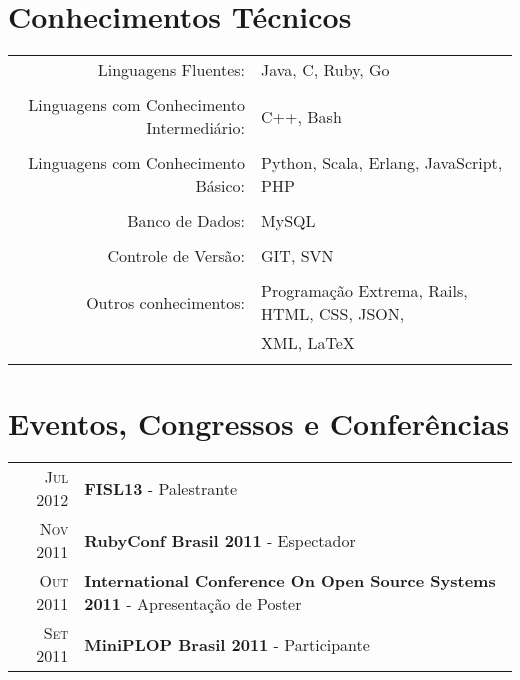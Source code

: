 \documentclass[a4paper,10pt]{article} %
\begin{document}

\section{Conhecimentos Técnicos}

\begin{tabular}{rp{11cm}}
Linguagens Fluentes: & Java, C, Ruby, Go\\
    \multicolumn{2}{c}{} \\

Linguagens com Conhecimento Intermediário: & C++, Bash\\
    \multicolumn{2}{c}{} \\

Linguagens com Conhecimento Básico: & Python, Scala, Erlang, JavaScript, PHP\\
    \multicolumn{2}{c}{} \\

Banco de Dados: & MySQL\\
    \multicolumn{2}{c}{} \\

Controle de Versão: & GIT, SVN\\
    \multicolumn{2}{c}{} \\

Outros conhecimentos: & Programação Extrema, Rails, HTML, CSS, JSON,\\& XML, \LaTeX\\
    \multicolumn{2}{c}{} \\

\end{tabular}


\section{Eventos, Congressos e Conferências}

\begin{tabular}{rl}
\textsc{Jul} 2012 & \textbf{FISL13} - Palestrante\\

\textsc{Nov} 2011 & \textbf{RubyConf Brasil 2011} - Espectador\\
\textsc{Out} 2011 & \textbf{International Conference On Open Source Systems 2011} - Apresentação de Poster\\
\textsc{Set} 2011 & \textbf{MiniPLOP Brasil 2011} - Participante

\end{tabular}
\end{document}
